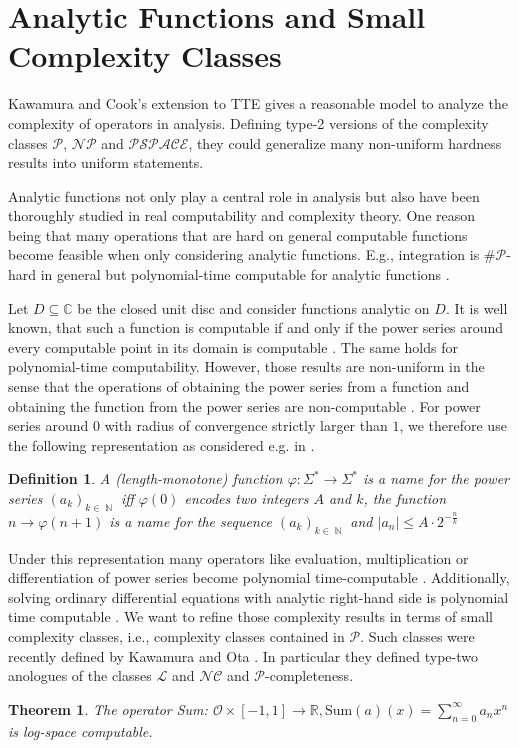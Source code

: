 \documentclass{article}
\newcommand{\RR}{\mathbb R}
\newcommand{\CC}{\mathbb C}
\DeclareMathOperator{\NN}{\mathbb N}
\newcommand{\abs}[1]{\left|#1\right|}
\newcommand{\p}{\ensuremath{\mathcal P}\xspace}
\newcommand{\np}{\ensuremath{\mathcal{NP}}\xspace}
\newcommand{\cl}{\ensuremath{\mathcal{L}}\xspace}
\newcommand{\nc}{\ensuremath{\mathcal{NC}}\xspace}
\newcommand{\sharpp}{\ensuremath{\# \mathcal{P}}\xspace}
\newcommand{\pspace}{\ensuremath{ \mathcal{PSPACE}}\xspace}
\newtheorem{definition}{Definition}
\newtheorem{theorem}{Theorem}
\begin{document}
\section*{Analytic Functions and Small Complexity Classes}
Kawamura and Cook's extension to TTE \cite{AkiACM} gives a reasonable model to  analyze the complexity of operators in analysis.
Defining type-2 versions of the complexity classes \p, \np and \pspace, they could generalize many non-uniform hardness results into uniform statements.

Analytic functions not only play a central role in analysis but also have been thoroughly studied in real computability and complexity theory.
One reason being that many operations that are hard on general computable functions become feasible when only considering analytic functions.
E.g., integration is \sharpp-hard in general \cite{MR748898,AkiACM} but polynomial-time computable for analytic functions \cite{MR1137517, Kawamura2012}.  

Let $D \subseteq \CC$ be the closed unit disc and consider functions analytic on $D$.
It is well known, that such a function is computable if and only if the power series around every computable point in its domain is computable \cite{MR1137517}.
The same holds for polynomial-time computability.
However, those results are non-uniform in the sense that the operations of obtaining the power series from a function and obtaining the function from the power series are non-computable \cite{Mueller95}.
For power series around $0$ with radius of convergence strictly larger than $1$, we therefore use the following representation  as considered e.g. in \cite{Kawamura2012}.
\begin{definition}
  A (length-monotone) function $\varphi: \Sigma^* \to \Sigma^*$ is a name for the power series $(a_k)_{k \in \NN}$ iff
  $\varphi(0)$ encodes two integers $A$ and $k$,
  the function $n \to \varphi(n+1)$ is a name for the sequence $(a_k)_{k \in \NN}$ and
  $\abs{a_n} \leq A \cdot 2^{-\frac{n}{k}}$
\end{definition}
Under this representation many operators like evaluation, multiplication or differentiation of power series become polynomial time-computable \cite{Kawamura2012}.
Additionally, solving ordinary differential equations with analytic right-hand side is polynomial time computable \cite{Kawamura10}.
We want to refine those complexity results in terms of small complexity classes, i.e., complexity classes contained in \p.
Such classes were recently defined by Kawamura and Ota \cite{Kawamura2014}.
In particular they defined type-two anologues of the classes \cl and \nc and \p-completeness.
\begin{theorem}
  The operator Sum: $\mathcal{O} \times [-1,1] \to \RR, \text{Sum}(a)(x) = \sum_{n=0}^\infty a_nx^n$ is log-space computable.  
\end{theorem}

{}
\end{document}
